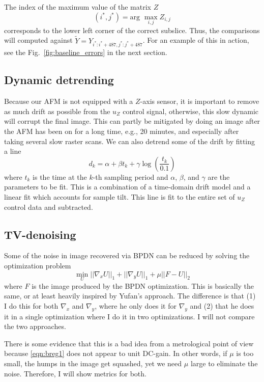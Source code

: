 \documentclass[11pt]{article}
\begin{document}
The index of the maximum value of the matrix $Z$
\begin{equation}
(i^*,j^*) = \textrm{arg~} \max_{i,j}Z_{i,j}
\end{equation}
corresponds to the lower left corner of the correct subslice. Thus, the comparisons will computed against
$\tilde{Y} = Y_{i^*:i^*+487, j^*:j^*+487}$. For an example of this in action, see the Fig.~\ref{fig:baseline_errors} in the next section.


\subsection{Dynamic detrending}
Because our AFM is not equipped with a $Z$-axis sensor, it is important to remove as much drift as possible from the $u_Z$ control signal, otherwise, this slow dynamic will corrupt the final image. This can partly be mitigated by doing an image after the AFM has been on for a long time, e.g., 20 minutes, and especially after taking several slow raster scans. We can also detrend some of the drift by fitting a line
\begin{equation}
  d_k = \alpha + \beta t_k + \gamma \log\left(\frac{t_k}{0.1}\right)
\end{equation}
where $t_k$ is the time at the $k$-th sampling period and $\alpha$, $\beta$, and $\gamma$ are the parameters to be fit. This is a combination of a time-domain drift model \cite{Jung_open_loop_2000} and a linear fit which accounts for sample tilt. This line is fit to the entire set of $u_Z$ control data and subtracted.


\subsection{ TV-denoising}
Some of the noise in image recovered via BPDN can be reduced by solving the optimization problem
\begin{equation}
  \min_{U} ||\nabla_xU||_1 + ||\nabla_yU||_1 + \mu||F - U||_2 \label{eqn:breg1}
\end{equation}
where $F$ is the image produced by the BPDN optimization. 
This is basically the same, or at least heavily inspired by Yufan's approach. The difference is that (1) I do this for both $\nabla_x$ and $\nabla_y$, where he only does it for $\nabla_y$ and (2) that he does it in a single optimization where I do it in two optimizations. I will not compare the two approaches.

There is some evidence that this is a bad idea from a metrological point of view because \eqref{eqn:breg1} does not appear to unit DC-gain. In other words, if $\mu$ is too small, the humps in the image get squashed, yet we need $\mu$ large to eliminate the noise. Therefore, I will show metrics for both.
\end{document}
